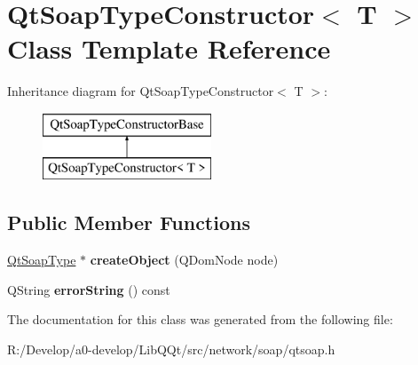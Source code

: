\hypertarget{class_qt_soap_type_constructor}{}\section{Qt\+Soap\+Type\+Constructor$<$ T $>$ Class Template Reference}
\label{class_qt_soap_type_constructor}
Inheritance diagram for Qt\+Soap\+Type\+Constructor$<$ T $>$\+:\begin{figure}[H]
\begin{center}
\leavevmode
\includegraphics[height=2.000000cm]{class_qt_soap_type_constructor}
\end{center}
\end{figure}
\subsection*{Public Member Functions}
\begin{DoxyCompactItemize}
\item 
\mbox{\label{class_qt_soap_type_constructor_a53feaffb12083f0364aa0a33419c0086}} 
\mbox{\hyperlink{class_qt_soap_type}{Qt\+Soap\+Type}} $\ast$ {\bfseries create\+Object} (Q\+Dom\+Node node)
\item 
\mbox{\label{class_qt_soap_type_constructor_a409e61dfe65e447dcf50368994d68611}} 
Q\+String {\bfseries error\+String} () const
\end{DoxyCompactItemize}


The documentation for this class was generated from the following file\+:\begin{DoxyCompactItemize}
\item 
R\+:/\+Develop/a0-\/develop/\+Lib\+Q\+Qt/src/network/soap/qtsoap.\+h\end{DoxyCompactItemize}
